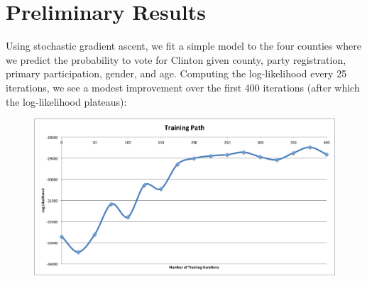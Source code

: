 \documentclass[10pt, letterpaper]{article}
\begin{document}




\section{Preliminary Results}

Using stochastic gradient ascent, we fit a simple model to the four counties where we predict the probability to vote for Clinton given county, party registration, primary participation, gender, and age. Computing the log-likelihood every 25 iterations, we see a modest improvement over the first 400 iterations (after which the log-likelihood plateaus): 
\begin{figure}[H]
\centering
\includegraphics[scale = 0.4]{TrainingPath}
\end{figure}
\end{document}
